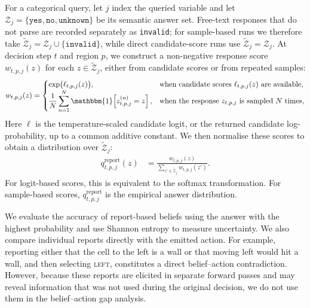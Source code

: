 \documentclass{article}
\begin{document}
For a categorical query, let $j$ index the queried variable and let $\mathcal Z_j=\{\texttt{yes},\texttt{no},\texttt{unknown}\}$ be its semantic answer set.
Free-text responses that do not parse are recorded separately as \texttt{invalid}; for sample-based runs we therefore take $\widetilde{\mathcal Z}_j=\mathcal Z_j\cup\{\texttt{invalid}\}$, while direct candidate-score runs use $\widetilde{\mathcal Z}_j=\mathcal Z_j$.
At decision step $t$ and region $p$, we construct a non-negative response score $w_{t,p,j}(z)$ for each $z\in\widetilde{\mathcal Z}_j$, either from candidate scores or from repeated samples:
\begin{align}
    w_{t,p,j}(z)
    &=
    \begin{cases}
        \exp\bigl(\ell_{t,p,j}(z)\bigr),
        & \text{when candidate scores $\ell_{t,p,j}(z)$ are available},\\
        \displaystyle \frac{1}{N}
        \sum_{n=1}^{N}
        \mathbbm{1}\!\left[z_{t,p,j}^{(n)}=z\right],
        & \text{when the response $z_{t,p,j}$ is sampled $N$ times},
    \end{cases}
    \label{eq:report-score}\\
\end{align}
Here $\ell$ is the temperature-scaled candidate logit, or the returned candidate log-probability, up to a common additive constant.
We then normalise these scores to obtain a distribution over $\widetilde{\mathcal Z}_j$:
\begin{align}
    q_{t,p,j}^{\mathrm{report}}(z)
    &=
    \frac{w_{t,p,j}(z)}
    {\sum_{z' \in \widetilde{\mathcal Z}_j} w_{t,p,j}(z')}.
    \label{eq:report-belief}
\end{align}
For logit-based scores, this is equivalent to the softmax transformation.
For sample-based scores, $q_{t,p,j}^{\mathrm{report}}$ is the empirical answer distribution.

We evaluate the accuracy of report-based beliefs using the answer with the highest probability and use Shannon entropy to measure uncertainty.
We also compare individual reports directly with the emitted action.
For example, reporting either that the cell to the left is a wall or that moving left would hit a wall, and then selecting \textsc{left}, constitutes a direct belief--action contradiction.
However, because these reports are elicited in separate forward passes and may reveal information that was not used during the original decision, we do not use them in the belief--action gap analysis.
\end{document}
